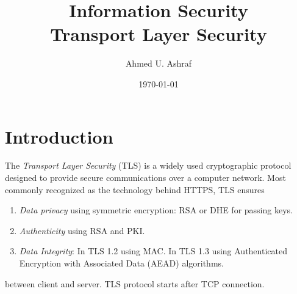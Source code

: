 \documentclass[a4paper, 12pt]{book} %
\title{Information Security \\ Transport Layer Security}
\author{Ahmed U. Ashraf}
\date{\today }
\begin{document}
% 


\maketitle


\tableofcontents\label{toc}










\newpage







\chapter{Introduction}




The \emph{Transport Layer Security} (TLS) is a widely used cryptographic protocol designed to provide secure communications over a computer network. Most commonly recognized as the technology behind HTTPS, TLS ensures 
\begin{enumerate}
    \item \emph{Data privacy} using symmetric encryption: RSA or DHE for passing keys.
    \item \emph{Authenticity} using RSA and PKI.
    \item \emph{Data Integrity}: In TLS 1.2 using MAC. In TLS 1.3 using Authenticated Encryption with Associated Data (AEAD) algorithms.
\end{enumerate}
between client and server. TLS protocol starts after TCP connection. 
\end{document}
